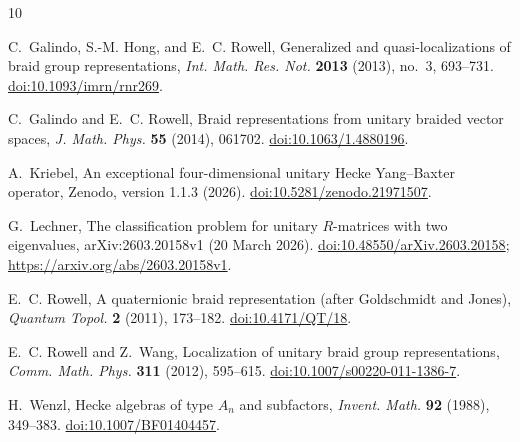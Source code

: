 \documentclass[11pt]{article}
\theoremstyle{remark}
\begin{document}
\begin{thebibliography}{10}

C.~Galindo, S.-M. Hong, and E.~C. Rowell,
\newblock Generalized and quasi-localizations of braid group representations,
\newblock \emph{Int. Math. Res. Not.} \textbf{2013} (2013), no.~3, 693--731.
\newblock \href{https://doi.org/10.1093/imrn/rnr269}{doi:10.1093/imrn/rnr269}.

C.~Galindo and E.~C. Rowell,
\newblock Braid representations from unitary braided vector spaces,
\newblock \emph{J. Math. Phys.} \textbf{55} (2014), 061702.
\newblock \href{https://doi.org/10.1063/1.4880196}{doi:10.1063/1.4880196}.

A.~Kriebel,
\newblock An exceptional four-dimensional unitary Hecke Yang--Baxter operator,
\newblock Zenodo, version 1.1.3 (2026).
\newblock \href{https://doi.org/10.5281/zenodo.21971507}
{doi:10.5281/zenodo.21971507}.

G.~Lechner,
\newblock The classification problem for unitary \(R\)-matrices with two
eigenvalues,
\newblock arXiv:2603.20158v1 (20 March 2026).
\newblock \href{https://doi.org/10.48550/arXiv.2603.20158}
{doi:10.48550/arXiv.2603.20158};
\url{https://arxiv.org/abs/2603.20158v1}.

E.~C. Rowell,
\newblock A quaternionic braid representation (after Goldschmidt and Jones),
\newblock \emph{Quantum Topol.} \textbf{2} (2011), 173--182.
\newblock \href{https://doi.org/10.4171/QT/18}{doi:10.4171/QT/18}.

E.~C. Rowell and Z.~Wang,
\newblock Localization of unitary braid group representations,
\newblock \emph{Comm. Math. Phys.} \textbf{311} (2012), 595--615.
\newblock \href{https://doi.org/10.1007/s00220-011-1386-7}
{doi:10.1007/s00220-011-1386-7}.

H.~Wenzl,
\newblock Hecke algebras of type \(A_n\) and subfactors,
\newblock \emph{Invent. Math.} \textbf{92} (1988), 349--383.
\newblock \href{https://doi.org/10.1007/BF01404457}
{doi:10.1007/BF01404457}.

\end{thebibliography}
\end{document}
